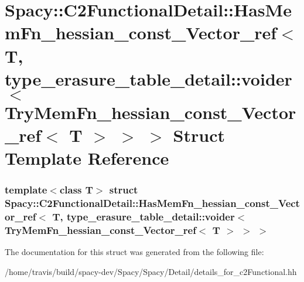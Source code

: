 \hypertarget{structSpacy_1_1C2FunctionalDetail_1_1HasMemFn__hessian__const__Vector__ref_3_01T_00_01type__eras8e7ff1912db2310c6f386df0dc928883}{\section{\-Spacy\-:\-:\-C2\-Functional\-Detail\-:\-:\-Has\-Mem\-Fn\-\_\-hessian\-\_\-const\-\_\-\-Vector\-\_\-ref$<$ \-T, type\-\_\-erasure\-\_\-table\-\_\-detail\-:\-:voider$<$ \-Try\-Mem\-Fn\-\_\-hessian\-\_\-const\-\_\-\-Vector\-\_\-ref$<$ \-T $>$ $>$ $>$ \-Struct \-Template \-Reference}
\label{structSpacy_1_1C2FunctionalDetail_1_1HasMemFn__hessian__const__Vector__ref_3_01T_00_01type__eras8e7ff1912db2310c6f386df0dc928883}
}
\subsubsection*{template$<$class T$>$ struct Spacy\-::\-C2\-Functional\-Detail\-::\-Has\-Mem\-Fn\-\_\-hessian\-\_\-const\-\_\-\-Vector\-\_\-ref$<$ T, type\-\_\-erasure\-\_\-table\-\_\-detail\-::voider$<$ Try\-Mem\-Fn\-\_\-hessian\-\_\-const\-\_\-\-Vector\-\_\-ref$<$ T $>$ $>$ $>$}



\-The documentation for this struct was generated from the following file\-:\begin{DoxyCompactItemize}
\item 
/home/travis/build/spacy-\/dev/\-Spacy/\-Spacy/\-Detail/details\-\_\-for\-\_\-c2\-Functional.\-hh\end{DoxyCompactItemize}
